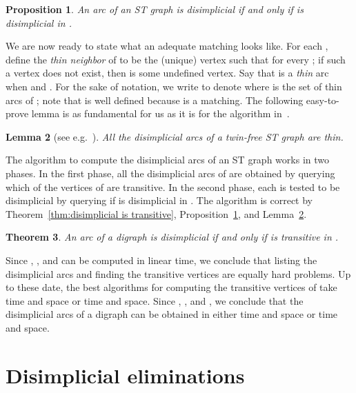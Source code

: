 \documentclass[a4paper,11pt]{article}
\newtheorem{theorem}{Theorem}
\newtheorem{lemma}[theorem]{Lemma}
\newtheorem{proposition}[theorem]{Proposition}
\begin{document}
\begin{proposition}\label{prop:twin reduction}
  An arc  of an ST graph  is disimplicial if and only if\/  is disimplicial in . 
\end{proposition}

We are now ready to state what an adequate matching looks like.  For each , define the \emph{thin neighbor}  of  to be the (unique) vertex  such that  for every ; if such a vertex does not exist, then  is some undefined vertex.  Say that  is a \emph{thin} arc when  and .  For the sake of notation, we write  to denote  where  is the set of thin arcs of ; note that  is well defined because  is a matching. The following easy-to-prove lemma is as fundamental for us as it is for the algorithm in~\cite{BomhoffMantheyDAM2013}.

\begin{lemma}[see e.g.~\cite{BomhoffMantheyDAM2013}]\label{lem:disimplicial is thin}
  All the disimplicial arcs of a twin-free ST graph are thin. 
\end{lemma}

The algorithm to compute the disimplicial arcs of an ST graph works in two phases.  In the first phase, all the disimplicial arcs of  are obtained by querying which of the vertices of  are transitive.  In the second phase, each  is tested to be disimplicial by querying if  is disimplicial in .   The algorithm is correct by Theorem~\ref{thm:disimplicial is transitive}, Proposition~\ref{prop:twin reduction}, and Lemma~\ref{lem:disimplicial is thin}.  

\begin{theorem}\label{thm:disimplicial algorithm}
  An arc  of a digraph  is disimplicial if and only if\/  is transitive in\/ .
\end{theorem}

Since , , and  can be computed in linear time, we conclude that listing the disimplicial arcs and finding the transitive vertices are equally hard problems. Up to these date, the best algorithms for computing the transitive vertices of  take  time and  space or  time and  space. Since , , and , we conclude that the disimplicial arcs of a digraph  can be obtained in either  time and  space or  time and  space.

\section{Disimplicial eliminations}
\label{sec:disimplicial elimination}
\end{document}
